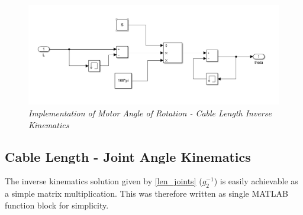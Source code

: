 \documentclass[a4paper,12pt]{report}
\begin{document}
\begin{figure}[H]
	\centering
	\includegraphics[width=\textwidth]{images/g1_inv.png}
	\caption{\textit{Implementation of Motor Angle of Rotation - Cable Length Inverse Kinematics }}
	\label{g1_inv}
\end{figure}


\subsection{Cable Length - Joint Angle Kinematics}

The inverse kinematics solution given by \ref{len_joints} ($g_2^{-1}$) is easily achievable as a simple matrix multiplication. This was therefore written as single MATLAB function block for simplicity.
\end{document}
